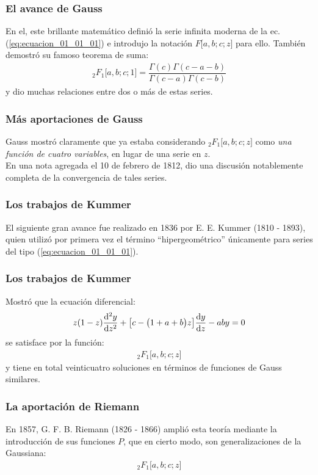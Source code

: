\documentclass[12pt]{beamer}
\begin{document}
\begin{frame}
\frametitle{El avance de Gauss}
En el, este brillante matemático definió la serie infinita moderna de la ec. (\ref{eq:ecuacion_01_01_01}) e introdujo la notación $F \big[a, b; c; z \big]$ para ello. También demostró su famoso teorema de suma:
\pause
\begin{align}
{}_{2} F_{1} \big[ a, b; c; 1 \big] = \dfrac{\Gamma (c) \Gamma (c - a - b)}{\Gamma(c - a) \Gamma (c - b)}
\label{eq:ecuacion_01_01_05}
\end{align}
y dio muchas relaciones entre dos o más de estas series.
\end{frame}
\begin{frame}
\frametitle{Más aportaciones de Gauss}
Gauss mostró claramente que ya estaba considerando ${}_{2} F_{1} \big[ a, b; c; z \big]$ como \emph{una función de cuatro variables}, en lugar de una serie en $z$.
\\
\bigskip
\pause
En una nota agregada el 10 de febrero de 1812, dio una discusión notablemente completa de la convergencia de tales series.
\end{frame}
\begin{frame}
\frametitle{Los trabajos de Kummer}
El siguiente gran avance fue realizado en 1836 por E. E. Kummer (1810 - 1893), quien utilizó por primera vez el término \enquote{hipergeométrico} únicamente para series del tipo (\ref{eq:ecuacion_01_01_01}).
\end{frame}
\begin{frame}
\frametitle{Los trabajos de Kummer}
Mostró que la ecuación diferencial:
\pause
\begin{align}
z (1 - z) \dv[2]{y}{z} + \big[ c - \big( 1 + a + b \big) z \big] \dv{y}{z} - a b y = 0
\label{eq:ecuacion_01_01_06}
\end{align}
se satisface por la función:
\pause
\begin{align*}
{}_{2} F_{1} \big[ a, b; c; z \big]
\end{align*}
y tiene en total veinticuatro soluciones en términos de funciones de Gauss similares.
\end{frame}
\begin{frame}
\frametitle{La aportación de Riemann}
En 1857, G. F. B. Riemann (1826 - 1866) amplió esta teoría mediante la introducción de sus funciones $P$, que en cierto modo, son generalizaciones de la Gaussiana:
\pause
\begin{align*}
{}_{2} F_{1} \big[ a, b; c; z \big]
\end{align*}    
\end{frame}
\end{document}
